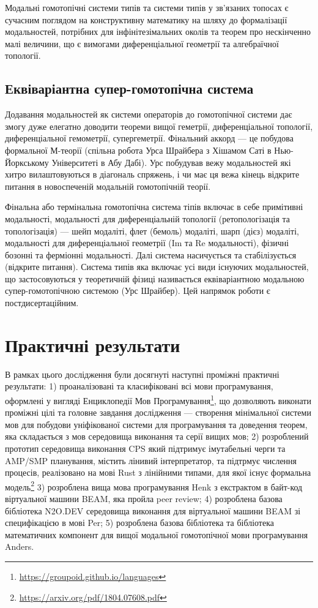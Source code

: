 Модальні гомотопічні системи типів та системи типів у зв'язаних топосах є сучасним поглядом на
конструктивну математику на шляху до формалізації модальностей, потрібних для інфінітезімальних околів та
теорем про нескінченно малі величини, що є вимогами диференціальної геометрії та алгебраїчної топології.

\subsection{Еквіваріантна супер-гомотопічна система}
Додавання модальностей як системи операторів до гомотопічної системи дає змогу дуже
елегатно доводити теореми вищої геметрії, диференціальної топології, диференціальної
гемометрії, супергеметрії. Фінальний аккорд --- це побудова формальної М-теорії (спільна робота Урса Шрайбера
з Хішамом Саті в Нью-Йоркському Університеті в Абу Дабі). Урс побудував вежу модальностей які хитро вилаштовуються
в діагональ спряжень, і чи має ця вежа кінець відкрите питання в новоспеченій модальній гомотопічній теорії.

Фінальна або термінальна гомотопічна система тіпів включає в себе примітивні модальності,
модальності для диференціальній топології (ретопологізація та топологізація) — шейп модаліті,
флет (бемоль) модаліті, шарп (дієз) модаліті, модальності для диференціальної
геометрії (Im та Re модальності), фізичні бозонні та ферміонні модальності. Далі система
насичується та стабілізується (відкрите питання). Система типів яка включає
усі види існуючих модальностей, що застосовуються у теоретичній фізиці називається еквіваріантною
модальною супер-гомотопічною системою (Урс Шрайбер). Цей напрямок роботи є постдисертаційним.

\section{Практичні результати}
В рамках цього дослідження були досягнуті наступні проміжні практичні результати:
1) проаналізовані та класифіковані всі мови програмування, оформлені у вигляді
   Енциклопедії Мов Програмування\footnote{\url{https://groupoid.github.io/languages}},
   що дозволяють виконати проміжні цілі та головне завдання дослідження --- створення
   мінімальної системи мов для побудови уніфікованої системи для програмування та доведення теорем,
   яка складається з мов середовища виконання та серії вищих мов;
2) розроблений прототип середовища виконання CPS який підтримує імутабельні черги
   та AMP/SMP планування, містить лінивий інтерпретатор, та підтрмує числення процесів,
   реалізовано на мові Rust з лінійними типами,
   для якої існує формальна модель\footnote{\url{https://arxiv.org/pdf/1804.07608.pdf}}
3) розроблена вища мова програмування Henk з екстрактом в байт-код віртуальної
   машини BEAM, яка пройла peer review;
4) розроблена базова бібліотека N2O.DEV середовища виконання для віртуальної
   машини BEAM зі специфікацією в мові Per;
5) розроблена базова бібліотека та бібліотека математичних компонент для вищої
   модальної гомотопічної мови програмування Anders.

